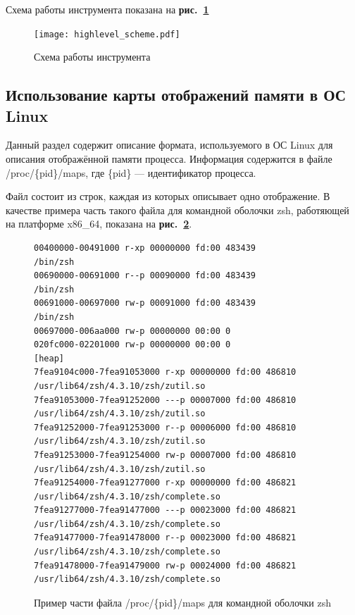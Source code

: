 \documentclass[a4paper,12pt,russian]{article}
\newcommand{\picref}[1]{\textbf{рис.~\ref{#1}}}
\newcommand{\code}[1]{\textsf{#1}}
\begin{document}
Схема работы инструмента показана на \picref{highlevel_scheme_fig}

\begin{figure}[h!]
  \center
  \texttt{[image: highlevel\_scheme.pdf]}
  \hfill
  \caption{Схема работы инструмента}
  \label{highlevel_scheme_fig}
\end{figure}


\subsection{Использование карты отображений памяти в ОС \code{Linux}}
Данный раздел содержит описание формата, используемого в ОС \code{Linux} для описания отображённой памяти процесса.
Информация содержится в файле \code{/proc/\{pid\}/maps}, где \code{\{pid\}} --- идентификатор процесса.

Файл состоит из строк, каждая из которых описывает одно отображение.
В качестве примера часть такого файла для командной оболочки \code{zsh}, работяющей на платформе \code{x86\_64}, показана на \picref{zsh_maps_lst}.

\begin{figure}[h]
\begin{lstlisting}[basicstyle=\tiny, numbers=none]
00400000-00491000 r-xp 00000000 fd:00 483439              /bin/zsh
00690000-00691000 r--p 00090000 fd:00 483439              /bin/zsh
00691000-00697000 rw-p 00091000 fd:00 483439              /bin/zsh
00697000-006aa000 rw-p 00000000 00:00 0
020fc000-02201000 rw-p 00000000 00:00 0                   [heap]
7fea9104c000-7fea91053000 r-xp 00000000 fd:00 486810      /usr/lib64/zsh/4.3.10/zsh/zutil.so
7fea91053000-7fea91252000 ---p 00007000 fd:00 486810      /usr/lib64/zsh/4.3.10/zsh/zutil.so
7fea91252000-7fea91253000 r--p 00006000 fd:00 486810      /usr/lib64/zsh/4.3.10/zsh/zutil.so
7fea91253000-7fea91254000 rw-p 00007000 fd:00 486810      /usr/lib64/zsh/4.3.10/zsh/zutil.so
7fea91254000-7fea91277000 r-xp 00000000 fd:00 486821      /usr/lib64/zsh/4.3.10/zsh/complete.so
7fea91277000-7fea91477000 ---p 00023000 fd:00 486821      /usr/lib64/zsh/4.3.10/zsh/complete.so
7fea91477000-7fea91478000 r--p 00023000 fd:00 486821      /usr/lib64/zsh/4.3.10/zsh/complete.so
7fea91478000-7fea91479000 rw-p 00024000 fd:00 486821      /usr/lib64/zsh/4.3.10/zsh/complete.so
\end{lstlisting}
\caption{Пример части файла \code{/proc/\{pid\}/maps} для командной оболочки \code{zsh}}
\label{zsh_maps_lst}
\end{figure}
\end{document}
